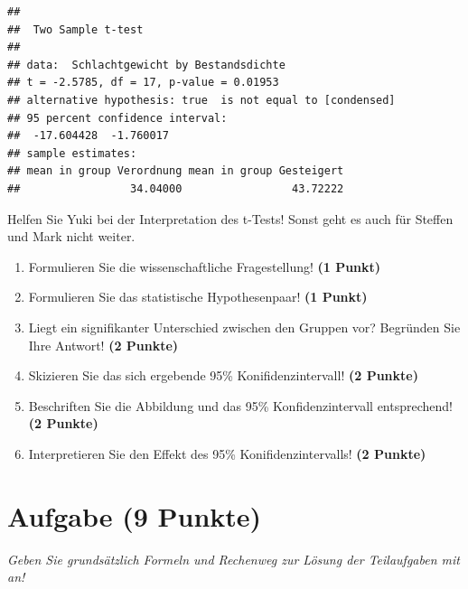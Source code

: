 \documentclass[a4paper, 9pt]{scrartcl}\usepackage[]{graphicx}\usepackage[]{xcolor}
\makeatletter
\newenvironment{kframe}{%
 \def\at@end@of@kframe{}%
 \ifinner\ifhmode%
  \def\at@end@of@kframe{\end{minipage}}%
  \begin{minipage}{\columnwidth}%
 \fi\fi%
 \def\FrameCommand##1{\hskip\@totalleftmargin \hskip-\fboxsep
 \colorbox{shadecolor}{##1}\hskip-\fboxsep
     \hskip-\linewidth \hskip-\@totalleftmargin \hskip\columnwidth}%
 \MakeFramed {\advance\hsize-\width
   \@totalleftmargin\z@ \linewidth\hsize
   \@setminipage}}%
 {\par\unskip\endMakeFramed%
 \at@end@of@kframe}
\newenvironment{knitrout}{}{} %
\makeatother
\begin{document}
\begin{knitrout}
\color{fgcolor}\begin{kframe}
\begin{verbatim}
## 
## 	Two Sample t-test
## 
## data:  Schlachtgewicht by Bestandsdichte
## t = -2.5785, df = 17, p-value = 0.01953
## alternative hypothesis: true  is not equal to [condensed]
## 95 percent confidence interval:
##  -17.604428  -1.760017
## sample estimates:
## mean in group Verordnung mean in group Gesteigert 
##                 34.04000                 43.72222
\end{verbatim}
\end{kframe}
\end{knitrout}

Helfen Sie Yuki bei der Interpretation des t-Tests! Sonst geht es auch für Steffen und Mark nicht weiter.

\begin{enumerate}
  \item Formulieren Sie die wissenschaftliche Fragestellung! \textbf{(1 Punkt)}
  \item Formulieren Sie das statistische Hypothesenpaar! \textbf{(1 Punkt)}
\item Liegt ein signifikanter Unterschied zwischen den Gruppen vor? Begründen Sie Ihre Antwort! \textbf{(2 Punkte)}
\item Skizieren Sie das sich ergebende 95\% Konifidenzintervall! \textbf{(2 Punkte)}
\item Beschriften Sie die Abbildung und das 95\% Konfidenzintervall entsprechend! \textbf{(2 Punkte)}  
\item Interpretieren Sie den Effekt des 95\% Konifidenzintervalls! \textbf{(2 Punkte)}
\end{enumerate} 
\clearpage

\section{Aufgabe \hfill (9 Punkte)}

\textit{Geben Sie grundsätzlich Formeln und Rechenweg zur Lösung der Teilaufgaben mit an!} \\[1Ex]
 
\end{document}
